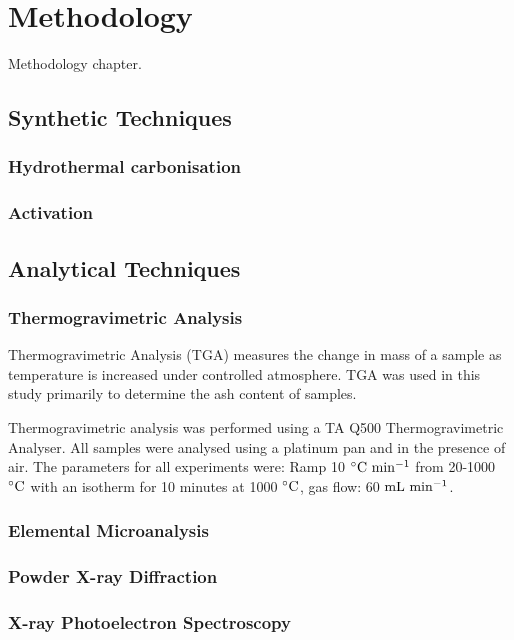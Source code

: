 \chapter{Methodology}
\label{ch:methodology}

Methodology chapter.

\section{Synthetic Techniques}
\subsection{Hydrothermal carbonisation}
\subsection{Activation}

\section{Analytical Techniques}

\subsection{Thermogravimetric Analysis}
Thermogravimetric Analysis (TGA) measures the change in mass of a sample as temperature is increased under controlled atmosphere.\cite{coats1963thermogravimetric} TGA was used in this study primarily to determine the ash content of samples.

Thermogravimetric analysis was performed using a TA Q500 Thermogravimetric Analyser. All samples were analysed using a platinum pan and in the presence of air. The parameters for all experiments were: Ramp 10 $\rm ^{\circ}C\ min^{-1}$ from 20-1000 $\rm ^{\circ}C$ with an isotherm for 10 minutes at 1000 $\rm ^{\circ}C$, gas flow: 60 $\rm mL\ min^{-1}$.

\subsection{Elemental Microanalysis}
\subsection{Powder X-ray Diffraction}
\subsection{X-ray Photoelectron Spectroscopy}

